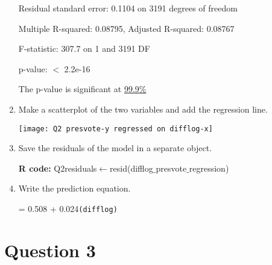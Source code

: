 \documentclass[12pt,letterpaper]{article}
\begin{document}
\begin{enumerate}
		Residual standard error: 0.1104 on 3191 degrees of freedom
		
		Multiple R-squared: 0.08795, Adjusted R-squared: 0.08767 
		
		F-statistic: 307.7 on 1 and 3191 DF
		
		p-value: $<$ 2.2e-16
		
		The p-value is significant at \underline{99.9\%}
		
		\vspace{2cm}
		\item Make a scatterplot of the two variables and add the regression line. 	
		
		\texttt{[image: Q2 presvote-y regressed on difflog-x]}
		\item Save the residuals of the model in a separate object.
		
		\-\hspace{0.5cm}\textbf{R code:} Q2residuals$\gets$resid(difflog$\_$presvote$\_$regression)
		\vspace{1cm}
		\item Write the prediction equation.
		
		\-\hspace{0.5cm} = 0.508 + 0.024\texttt{(difflog)}
	\end{enumerate}
	
	\newpage	
	\section*{Question 3}
	
\end{document}
